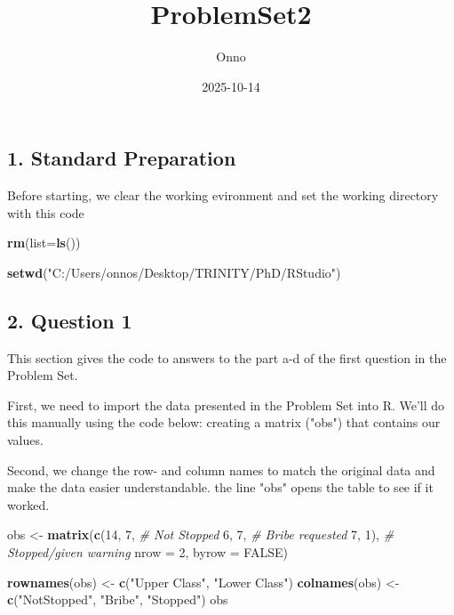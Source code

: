 \documentclass[
]{article}
\title{ProblemSet2}
\author{Onno}
\date{2025-10-14}
\newenvironment{Shaded}{\begin{snugshade}}{\end{snugshade}}
\newcommand{\AttributeTok}[1]{\textcolor[rgb]{0.13,0.29,0.53}{#1}}
\newcommand{\CommentTok}[1]{\textcolor[rgb]{0.56,0.35,0.01}{\textit{#1}}}
\newcommand{\ConstantTok}[1]{\textcolor[rgb]{0.56,0.35,0.01}{#1}}
\newcommand{\DecValTok}[1]{\textcolor[rgb]{0.00,0.00,0.81}{#1}}
\newcommand{\FunctionTok}[1]{\textcolor[rgb]{0.13,0.29,0.53}{\textbf{#1}}}
\newcommand{\NormalTok}[1]{#1}
\newcommand{\OtherTok}[1]{\textcolor[rgb]{0.56,0.35,0.01}{#1}}
\newcommand{\StringTok}[1]{\textcolor[rgb]{0.31,0.60,0.02}{#1}}
\begin{document}
\maketitle

\subsection{1. Standard Preparation}\label{Preparation}%
Before starting, we clear the working evironment and set the working directory with this code
\begin{Shaded}
\begin{Highlighting}[]
\FunctionTok{rm}\NormalTok{(}\AttributeTok{list=}\FunctionTok{ls}\NormalTok{())}

\FunctionTok{setwd}\NormalTok{(}\StringTok{"C:/Users/onnos/Desktop/TRINITY/PhD/RStudio"}\NormalTok{)}
\end{Highlighting}
\end{Shaded}

\subsection{2. Question 1}\label{question-1}
This section gives the code to answers to the part a-d of the first question in the Problem Set.

First, we need to import the data presented in the Problem Set into R. We'll do this manually using the code below: creating a matrix ("obs") that contains our values.

Second, we change the row- and column names to match the original data and make the data easier understandable. the line "obs" opens the table to see if it worked.

\begin{Shaded}
\begin{Highlighting}[]
\NormalTok{obs }\OtherTok{\textless{}{-}} \FunctionTok{matrix}\NormalTok{(}\FunctionTok{c}\NormalTok{(}\DecValTok{14}\NormalTok{, }\DecValTok{7}\NormalTok{,   }\CommentTok{\# Not Stopped}
                \DecValTok{6}\NormalTok{, }\DecValTok{7}\NormalTok{,    }\CommentTok{\# Bribe requested}
                \DecValTok{7}\NormalTok{, }\DecValTok{1}\NormalTok{),   }\CommentTok{\# Stopped/given warning}
              \AttributeTok{nrow =} \DecValTok{2}\NormalTok{,}
              \AttributeTok{byrow =} \ConstantTok{FALSE}\NormalTok{)}

\FunctionTok{rownames}\NormalTok{(obs) }\OtherTok{\textless{}{-}} \FunctionTok{c}\NormalTok{(}\StringTok{"Upper Class"}\NormalTok{, }\StringTok{"Lower Class"}\NormalTok{)}
\FunctionTok{colnames}\NormalTok{(obs) }\OtherTok{\textless{}{-}} \FunctionTok{c}\NormalTok{(}\StringTok{"NotStopped"}\NormalTok{, }\StringTok{"Bribe"}\NormalTok{, }\StringTok{"Stopped"}\NormalTok{)}
\NormalTok{obs}
\end{Highlighting}
\end{Shaded}
\end{document}
